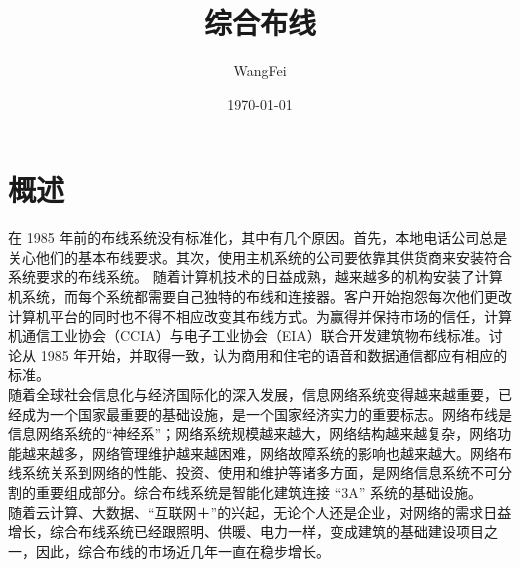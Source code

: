 \documentclass[12pt,UTF8]{ctexbook}
\title{\heiti\zihao{0} 综合布线}
\author{WangFei}
\date{\today}
\begin{document}
\maketitle
\tableofcontents

\mainmatter

\chapter{概述}

在 1985 年前的布线系统没有标准化，其中有几个原因。首先，本地电话公司总是关心他们的基本布线要求。其次，使用主机系统的公司要依靠其供货商来安装符合系统要求的布线系统。 随着计算机技术的日益成熟，越来越多的机构安装了计算机系统，而每个系统都需要自己独特的布线和连接器。客户开始抱怨每次他们更改计算机平台的同时也不得不相应改变其布线方式。为赢得并保持市场的信任，计算机通信工业协会（CCIA）与电子工业协会（EIA）联合开发建筑物布线标准。讨论从 1985 年开始，并取得一致，认为商用和住宅的语音和数据通信都应有相应的标准。\\

随着全球社会信息化与经济国际化的深入发展，信息网络系统变得越来越重要，已经成为一个国家最重要的基础设施，是一个国家经济实力的重要标志。网络布线是信息网络系统的“神经系”；网络系统规模越来越大，网络结构越来越复杂，网络功能越来越多，网络管理维护越来越困难，网络故障系统的影响也越来越大。网络布线系统关系到网络的性能、投资、使用和维护等诸多方面，是网络信息系统不可分割的重要组成部分。综合布线系统是智能化建筑连接 “3A” 系统的基础设施。\\

随着云计算、大数据、“互联网＋”的兴起，无论个人还是企业，对网络的需求日益增长，综合布线系统已经跟照明、供暖、电力一样，变成建筑的基础建设项目之一，因此，综合布线的市场近几年一直在稳步增长。

\backmatter
\end{document}

